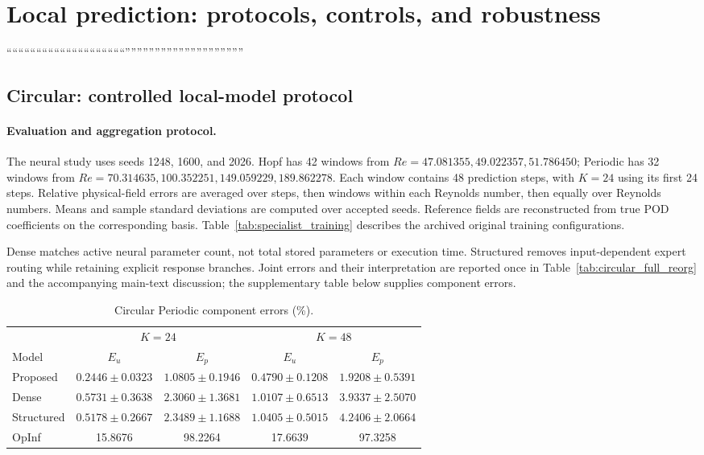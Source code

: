 \section{Local prediction: protocols, controls, and robustness}
\label{app:local_evidence}

````````````````````````````````````````''''''''''''''''''''''''''''''''''''''''
\subsection{Circular: controlled local-model protocol}
\label{app:circular}

\paragraph{Evaluation and aggregation protocol.}
The neural study uses seeds 1248, 1600, and 2026.
Hopf has 42 windows from
$Re=47.081355,49.022357,51.786450$; Periodic has 32 windows from
$Re=70.314635,100.352251,149.059229,189.862278$.
Each window contains 48 prediction steps, with $K=24$ using its
first 24 steps. Relative physical-field errors are averaged over
steps, then windows within each Reynolds number, then equally over
Reynolds numbers. Means and sample standard deviations are computed
over accepted seeds. Reference fields are reconstructed from true
POD coefficients on the corresponding basis.
Table~\ref{tab:specialist_training} describes the archived original
training configurations.

Dense matches active neural parameter count, not total stored
parameters or execution time. Structured removes input-dependent
expert routing while retaining explicit response branches.
Joint errors and their interpretation are reported once in
Table~\ref{tab:circular_full_reorg} and the accompanying main-text
discussion; the supplementary table below supplies component errors.

\begin{table}[t]
\centering
\small
\setlength{\tabcolsep}{3.5pt}
\caption{Circular Periodic component errors (\%).}
\label{tab:circular_full}
\begin{tabular}{@{}lcccc@{}}
\toprule
& \multicolumn{2}{c}{$K=24$} & \multicolumn{2}{c}{$K=48$}\\
\cmidrule(lr){2-3}\cmidrule(l){4-5}
Model & $E_u$ & $E_p$ & $E_u$ & $E_p$\\
\midrule
Proposed
& $0.2446\pm0.0323$ & $1.0805\pm0.1946$
& $0.4790\pm0.1208$ & $1.9208\pm0.5391$\\
Dense
& $0.5731\pm0.3638$ & $2.3060\pm1.3681$
& $1.0107\pm0.6513$ & $3.9337\pm2.5070$\\
Structured
& $0.5178\pm0.2667$ & $2.3489\pm1.1688$
& $1.0405\pm0.5015$ & $4.2406\pm2.0664$\\
OpInf & 15.8676 & 98.2264 & 17.6639 & 97.3258\\
\bottomrule
\end{tabular}
\end{table}



